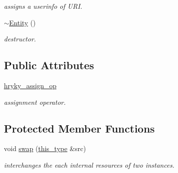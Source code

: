 \begin{DoxyCompactItemize}
\begin{DoxyCompactList}\small\item\em assigns a userinfo of U\-R\-I. \end{DoxyCompactList}\item 
\hypertarget{classhryky_1_1uri_1_1authority_1_1_entity_aaa7b10dc620fc9c7050d90e1e2521d2f}{\hyperlink{classhryky_1_1uri_1_1authority_1_1_entity_aaa7b10dc620fc9c7050d90e1e2521d2f}{$\sim$\-Entity} ()}\label{classhryky_1_1uri_1_1authority_1_1_entity_aaa7b10dc620fc9c7050d90e1e2521d2f}

\begin{DoxyCompactList}\small\item\em destructor. \end{DoxyCompactList}\end{DoxyCompactItemize}
\subsection*{Public Attributes}
\begin{DoxyCompactItemize}
\item 
\hypertarget{classhryky_1_1uri_1_1authority_1_1_entity_afedf72941ac5b494884915fe21d531df}{\hyperlink{classhryky_1_1uri_1_1authority_1_1_entity_afedf72941ac5b494884915fe21d531df}{hryky\-\_\-assign\-\_\-op}}\label{classhryky_1_1uri_1_1authority_1_1_entity_afedf72941ac5b494884915fe21d531df}

\begin{DoxyCompactList}\small\item\em assignment operator. \end{DoxyCompactList}\end{DoxyCompactItemize}
\subsection*{Protected Member Functions}
\begin{DoxyCompactItemize}
\item 
\hypertarget{classhryky_1_1uri_1_1authority_1_1_entity_ab0d4bcdb587b69e7dbc2242d60fa65ef}{void \hyperlink{classhryky_1_1uri_1_1authority_1_1_entity_ab0d4bcdb587b69e7dbc2242d60fa65ef}{swap} (\hyperlink{classhryky_1_1uri_1_1authority_1_1_entity_a72978dd715c7bda0b5b1015967ecc5fe}{this\-\_\-type} \&src)}\label{classhryky_1_1uri_1_1authority_1_1_entity_ab0d4bcdb587b69e7dbc2242d60fa65ef}

\begin{DoxyCompactList}\small\item\em interchanges the each internal resources of two instances. \end{DoxyCompactList}\end{DoxyCompactItemize}


